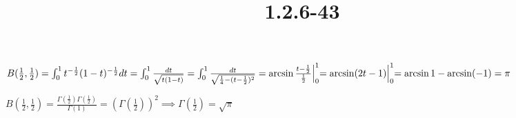 \documentclass{article}
\title{1.2.6-43}
\begin{document}
\maketitle

$B(\frac{1}{2}, \frac{1}{2}) = \int_0^1 t^{-\frac{1}{2}}(1-t)^{-\frac{1}{2}}dt = \int_0^1 \frac{dt}{\sqrt{t(1-t)}} = \int_0^1 \frac{dt}{\sqrt{\frac{1}{4}- (t-\frac{1}{2})^2}} = \arcsin \frac{t-\frac{1}{2}}{\frac{1}{2}} \Bigl|_0^1 = \arcsin (2t-1) \Bigl|_0^1 = \arcsin 1 - \arcsin (-1) = \pi$

$B(\frac{1}{2}, \frac{1}{2}) = \frac{\Gamma(\frac{1}{2}) \Gamma(\frac{1}{2})}{\Gamma(1)} = (\Gamma(\frac{1}{2}))^2 \implies \Gamma(\frac{1}{2}) = \sqrt{\pi}$
\end{document}
